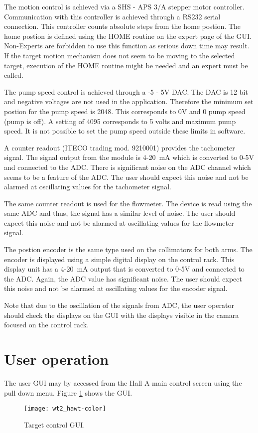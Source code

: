 The motion control is achieved via a SHS - APS 3/A stepper motor controller.
Communication with this controller is achieved through a RS232 serial
connection. This controller counts absolute steps from the home postion.
The home postion is defined using the HOME routine on the expert page
of the GUI. Non-Experts are forbidden to use this function as serious
down time may result. If the target motion mechanism does not seem
to be moving to the selected target, execution of the HOME routine
might be needed and an expert must be called.

The pump speed control is achieved through a -5 - 5V DAC. The DAC
is 12 bit and negative voltages are not used in the application. Therefore
the minimum set postion for the pump speed is 2048. This corresponds
to 0V and 0 pump speed (pump is off). A setting of 4095 corresponds
to 5 volts and maximum pump speed. It is not possible to set the pump
speed outside these limits in software.

A counter readout (ITECO trading mod. 9210001) provides the tachometer
signal. The signal output from the module is 4-20~mA which is converted
to 0-5V and connected to the ADC. There is significant noise on the
ADC channel which seems to be a feature of the ADC. The user should
expect this noise and not be alarmed at oscillating values for the
tachometer signal.

The same counter readout is used for the flowmeter. The device is
read using the same ADC and thus, the signal has a similar level of
noise. The user should expect this noise and not be alarmed at oscillating
values for the flowmeter signal.

The postion encoder is the same type used on the collimators for both
arms. The encoder is displayed using a simple digital display on the
control rack. This display unit has a 4-20~mA output that is converted
to 0-5V and connected to the ADC. Again, the ADC value has significant
noise. The user should expect this noise and not be alarmed at oscillating
values for the encoder signal.

Note that due to the oscillation of the signals from ADC, the user
operator should check the displays on the GUI with the displays visible
in the camara focused on the control rack.


\section{User operation}

The user GUI may by accessed from the Hall A main control screen using
the pull down menu. Figure \ref{fig: wt_GUI} shows the GUI. %
\begin{figure}
\begin{center}\texttt{[image: wt2\_hawt-color]}\end{center}


\caption{Target control GUI.\label{fig: wt_GUI}}
\end{figure}



